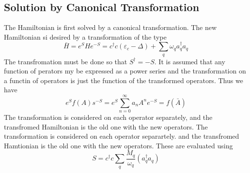 \subsection{Solution by Canonical Transformation}\label{4.3.1}
The Hamiltonian is first solved by a canonical transformation.
The new Hamiltonian si desired by a transformation of the type
\begin{equation}
    \bar{H} = e^S H e^{-S} = c^\dagger c\left(\varepsilon_c - \Delta \right) + \sum_q \omega_q a^\dagger_q a_q  \label{4.202}
\end{equation}
The transfromation must be done so that $S^\dagger = -S$.
It is assumed that any function of perators my be expressed as a power series and the transformation on a functin of operators is just the function of the transformed operators.
Thus we have
\begin{equation} \label{4.203}
    e^S f(A) s^{-S} = e^S \sum_{n=0}^\infty a_n A^n e^{-S} = f(\bar{A})
\end{equation}
The transformation is considered on each operator separately, and the transfromed Hamiltonian is the old one with the new operators.
The transformation is considered on each operator separartely. and the transfromed Hamtionian is the old one with the new operators.
These are evaluated using
\begin{equation}
    S = c^\dagger c \sum_q \frac{M_q}{\omega_q} \left(a^\dagger_q a_q \right)
\end{equation}
